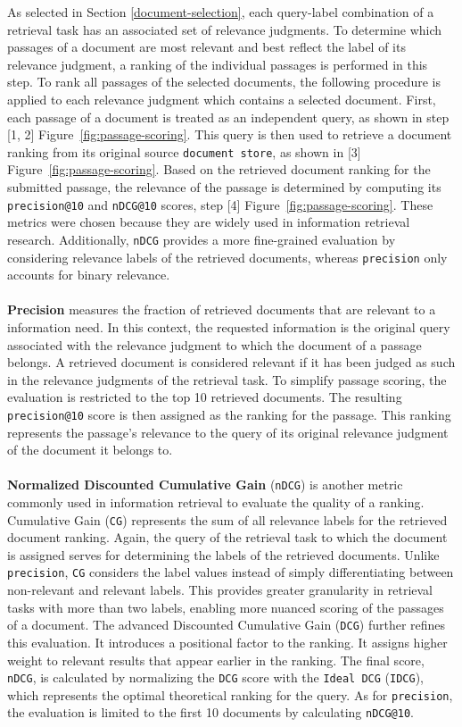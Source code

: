 As selected in Section \ref{document-selection}, each query-label combination of a retrieval task has an associated set of relevance judgments. To determine which passages of a document are most relevant and best reflect the label of its relevance judgment, a ranking of the individual passages is performed in this step. To rank all passages of the selected documents, the following procedure is applied to each relevance judgment which contains a selected document. First, each passage of a document is treated as an independent query, as shown in step [1, 2] Figure~\ref{fig:passage-scoring}. This query is then used to retrieve a document ranking from its original source \texttt{document store}, as shown in [3] Figure~\ref{fig:passage-scoring}. Based on the retrieved document ranking for the submitted passage, the relevance of the passage is determined by computing its \texttt{precision@10} and \texttt{nDCG@10} scores, step [4] Figure~\ref{fig:passage-scoring}. These metrics were chosen because they are widely used in information retrieval research. Additionally, \texttt{nDCG} provides a more fine-grained evaluation by considering relevance labels of the retrieved documents, whereas \texttt{precision} only accounts for binary relevance.
\\\\
\textbf{Precision} measures the fraction of retrieved documents that are relevant to a information need. In this context, the requested information is the original query associated with the relevance judgment to which the document of a passage belongs. A retrieved document is considered relevant if it has been judged as such in the relevance judgments of the retrieval task. To simplify passage scoring, the evaluation is restricted to the top 10 retrieved documents. The resulting \texttt{precision@10} score is then assigned as the ranking for the passage. This ranking represents the passage's relevance to the query of its original relevance judgment of the document it belongs to.
\\\\
\textbf{Normalized Discounted Cumulative Gain} (\texttt{nDCG}) is another metric commonly used in information retrieval to evaluate the quality of a ranking. Cumulative Gain (\texttt{CG}) represents the sum of all relevance labels for the retrieved document ranking. Again, the query of the retrieval task to which the document is assigned serves for determining the labels of the retrieved documents. Unlike \texttt{precision}, \texttt{CG} considers the label values instead of simply differentiating between non-relevant and relevant labels. This provides greater granularity in retrieval tasks with more than two labels, enabling more nuanced scoring of the passages of a document. The advanced Discounted Cumulative Gain (\texttt{DCG}) further refines this evaluation. It introduces a positional factor to the ranking. It assigns higher weight to relevant results that appear earlier in the ranking. The final score, \texttt{nDCG}, is calculated by normalizing the \texttt{DCG} score with the \texttt{Ideal DCG} (\texttt{IDCG}), which represents the optimal theoretical ranking for the query. As for \texttt{precision}, the evaluation is limited to the first 10 documents by calculating \texttt{nDCG@10}.
